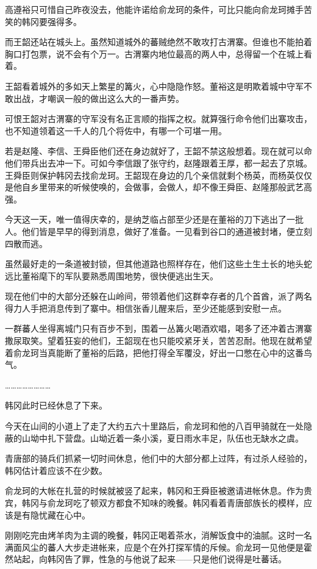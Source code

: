 高遵裕只可惜自己昨夜没去，他能许诺给俞龙珂的条件，可比只能向俞龙珂摊手苦笑的韩冈要强得多。

而王韶还站在城头上。虽然知道城外的蕃贼绝然不敢攻打古渭寨。但谁也不能拍着胸口打包票，说不会有个万一。古渭寨内地位最高的两人中，总得留一个在城上看着。

王韶看着城外的多如天上繁星的篝火，心中隐隐作怒。董裕这是明欺着城中守军不敢出战，才嘲讽一般的做出这么大的一番声势。

可恨王韶对古渭寨的守军没有名正言顺的指挥之权。就算强行命令他们出寨攻击，也不知道领着这一千人的几个将佐中，有哪一个可堪一用。

若是赵隆、李信、王舜臣他们还在身边就好了，王韶不禁这般想着。现在就可以命他们带兵出去冲一下。可如今李信跟了张守约，赵隆跟着王厚，都一起去了京城。王舜臣则保护韩冈去找俞龙珂。王韶现在身边的几个亲信就剩个杨英，而杨英仅仅是他自乡里带来的听候使唤的，会做事，会做人，却不像王舜臣、赵隆那般武艺高强。

今天这一天，唯一值得庆幸的，是纳芝临占部至少还是在董裕的刀下逃出了一批人。他们皆是早早的得到消息，做好了准备。一见看到谷口的通道被封堵，便立刻四散而逃。

虽然最好走的一条道被封锁，但其他道路也照样存在，他们这些土生土长的地头蛇远比董裕麾下的军队要熟悉周围地势，很快便逃出生天。

现在他们中的大部分还躲在山岭间，带领着他们这群幸存者的几个首酋，派了两名得力人手把消息传到了寨中。相信张香儿醒来后，至少还能感到安慰一点。

一群蕃人坐得离城门只有百步不到，围着一丛篝火喝酒欢唱，喝多了还冲着古渭寨撒尿取笑。望着狂妄的他们，王韶现在也只能咬紧牙关，苦苦忍耐。他现在就希望着俞龙珂当真能断了董裕的后路，把他打得全军覆没，好出一口憋在心中的这番鸟气。

……………………

韩冈此时已经休息了下来。

今天在山间的小道上了走了大约五六十里路后，俞龙珂和他的八百甲骑就在一处隐蔽的山坳中扎下营盘。山坳近着一条小溪，夏日雨水丰足，队伍也无缺水之虞。

青唐部的骑兵们抓紧一切时间休息，他们中的大部分都上过阵，有过杀人经验的，韩冈估计着应该不在少数。

俞龙珂的大帐在扎营的时候就被竖了起来，韩冈和王舜臣被邀请进帐休息。作为贵宾，韩冈与俞龙珂吃了顿双方都食不知味的晚餐。韩冈看着青唐部族长的模样，应该是有隐忧藏在心中。

刚刚吃完由烤羊肉为主调的晚餐，韩冈正喝着茶水，消解饭食中的油腻。这时一名满面风尘的蕃人大步走进帐来，应是个在外打探军情的斥候。俞龙珂一见他便是霍然站起，向韩冈告了罪，性急的与他说了起来——只是他们说得是吐蕃话。


